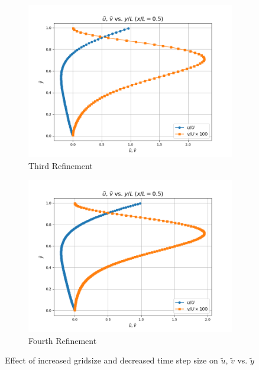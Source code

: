 \documentclass[11pt]{article}
\begin{document}
\begin{figure}[H]
   \begin{subfigure}{0.495\linewidth}
      \includegraphics[width=\textwidth]{images/Velocity_Component_Plot_for_gridsize_80x80.png}
      \caption{Third Refinement}
   \end{subfigure}
   \begin{subfigure}{0.495\linewidth}
      \includegraphics[width=\textwidth]{images/Velocity_Component_Plot_for_gridsize_160x160.png}
      \caption{Fourth Refinement}
   \end{subfigure}
   \vspace{2.5mm}

   \caption{Effect of increased gridsize and decreased time step size on $\tilde{u}$, $\tilde{v}$ vs. $\tilde{y}$}
   \label{velocityrefine}
\end{figure}
\end{document}
